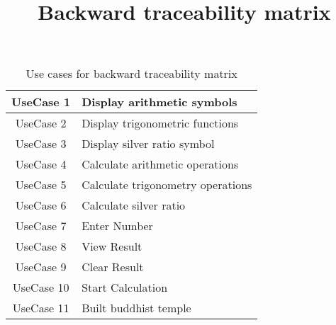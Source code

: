 \documentclass[12pt]{article}
\begin{document}
\title{Backward traceability matrix}
\date{\vspace{-5ex}}
\maketitle

\begin{table}[h]
    \begin{tabular}{|c|p{14cm}|}
    \hline
      UseCase 1   & Display arithmetic symbols \\
      \hline
       UseCase 2 & Display trigonometric functions \\
       \hline
       UseCase 3 & Display silver ratio symbol\\
       \hline
       UseCase 4 & Calculate arithmetic operations\\
       \hline
      UseCase 5 & Calculate trigonometry operations\\
       \hline
      UseCase 6 & Calculate silver ratio\\
       \hline
        UseCase 7 & Enter Number\\
       \hline
        UseCase 8 & View Result\\
       \hline
        UseCase 9 & Clear Result\\
       \hline
        UseCase 10 & Start Calculation\\
       \hline
        UseCase 11 & Built buddhist temple\\
       \hline
    \end{tabular}
    \caption{Use cases for backward traceability matrix} 
\label{table:1}
 \end{table}
 
\end{document}
